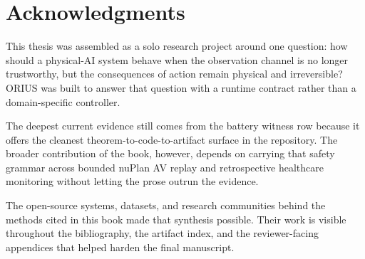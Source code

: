 \chapter*{Acknowledgments}

This thesis was assembled as a solo research project around one question: how should a
physical-AI system behave when the observation channel is no longer trustworthy, but the
consequences of action remain physical and irreversible?  ORIUS was built to answer that
question with a runtime contract rather than a domain-specific controller.

The deepest current evidence still comes from the battery witness row because it offers the
cleanest theorem-to-code-to-artifact surface in the repository.  The broader contribution of
the book, however, depends on carrying that safety grammar across bounded nuPlan AV replay
and retrospective healthcare monitoring without letting the prose outrun the evidence.

The open-source systems, datasets, and research communities behind the methods cited in this
book made that synthesis possible.  Their work is visible throughout the bibliography, the
artifact index, and the reviewer-facing appendices that helped harden the final manuscript.
